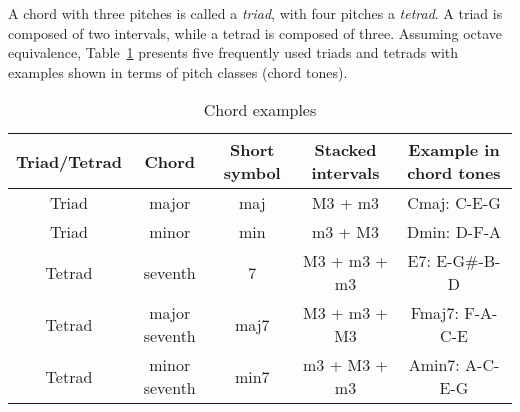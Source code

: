 A chord with three pitches is called a {\it triad}, with four pitches a {\it tetrad}. A triad is composed of two intervals, while a tetrad is composed of three. Assuming octave equivalence, Table~\ref{tab:2-chords} presents five frequently used triads and tetrads with examples shown in terms of pitch classes (chord tones).
\begin{table}[htb]
\caption{Chord examples}
\centering
\scriptsize
\begin{tabular}{|c|c|c|c|c|} \hline
Triad/Tetrad & Chord & Short symbol & Stacked intervals & Example in chord tones \\ \hline
Triad & major & maj & M3 + m3 & Cmaj: C-E-G \\ \hline
Triad & minor & min & m3 + M3 & Dmin: D-F-A \\ \hline
Tetrad  & seventh & 7 & M3 + m3 + m3 & E7: E-G\#-B-D \\ \hline
Tetrad & major seventh & maj7 & M3 + m3 + M3 & Fmaj7: F-A-C-E \\ \hline
Tetrad & minor seventh & min7 & m3 + M3 + m3 & Amin7: A-C-E-G \\ \hline
\end{tabular}
\label{tab:2-chords}
\end{table}

